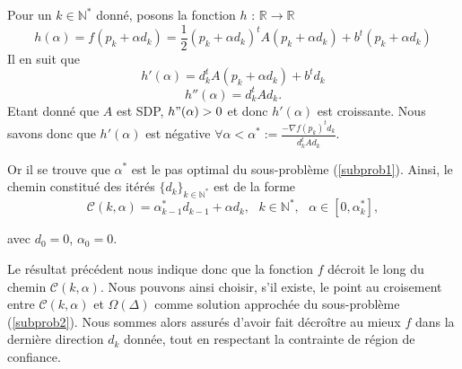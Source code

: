 
Pour un $k \in \mathbb{N}^*$ donné, posons la fonction $h\text{ : }\mathbb{R} \rightarrow \mathbb{R}$
\begin{equation}\tag{1}
    h(\alpha) = f(p_k + \alpha d_k) = \frac{1}{2}(p_k +\alpha d_k)^t A(p_k +\alpha d_k) + b^t(p_k +\alpha d_k)
\end{equation}
Il en suit que
\begin{equation}\tag{2.a}
    h'(\alpha) = d_k^t A(p_k +\alpha d_k) + b^t d_k
\end{equation}
\vspace{-0.5cm}
\begin{equation}\tag{2.b}
    h''(\alpha) = d_k^t A d_k.
\end{equation}
Etant donné que $A$ est SDP, $h"(\alpha) > 0$ et donc $h'(\alpha)$ est croissante. Nous savons donc que $h'(\alpha)$ est négative $\forall \alpha < \alpha^* := \frac{-\nabla f(p_k)^t d_k}{d_k^t A d_k}$.

\noindent
Or il se trouve que $\alpha^*$ est le pas optimal du sous-problème (\ref{subprob1}). Ainsi, le chemin constitué des itérés $\{d_k\}_{k \in \mathbb{N}^*}$ est de la forme 
\begin{equation}\tag{4}
    \mathcal{C}(k, \alpha) = \alpha_{k-1}^*d_{k-1} + \alpha d_k, \text{ } k \in \mathbb{N}^*, \text{ } \alpha \in [0, \alpha_k^*],
\end{equation}
\begin{center}
    avec $d_0 = 0$, $\alpha_0 = 0$.
\end{center}

Le résultat précédent nous indique donc que la fonction $f$ décroit le long du chemin $\mathcal{C}(k, \alpha)$. Nous pouvons ainsi choisir, s'il existe, le point au croisement entre $\mathcal{C}(k, \alpha)$ et $\Omega(\Delta)$ comme solution approchée du sous-problème (\ref{subprob2}). Nous sommes alors assurés d'avoir fait décroître au mieux $f$ dans la dernière direction $d_k$ donnée, tout en respectant la contrainte de région de confiance.

